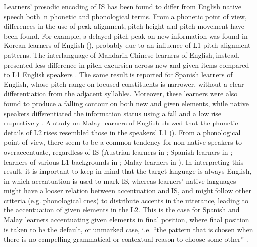 Learners’ prosodic encoding of IS has been found to differ from English native speech both in phonetic and phonological terms. From a phonetic point of view, differences in the use of peak alignment, pitch height and pitch movement have been found. For example, a delayed pitch peak on new information was found in Korean learners of English (\citealt{TrofimovichBaker2006}), probably due to an influence of L1 pitch alignment patterns. The interlanguage of Mandarin Chinese learners of English, instead, presented less difference in pitch excursion across new and given items compared to L1 English speakers \citep{Wennerstrom1998}. The same result is reported for Spanish learners of English, whose pitch range on focused constituents is narrower, without a clear differentiation from the adjacent syllables. Moreover, these learners were also found to produce a falling contour on both new and given elements, while native speakers differentiated the information status using a fall and a low rise respectively \citep{Verdugo2003}. A study on Malay learners of English showed that the phonetic details of L2 rises resembled those in the speakers’ L1 (\citealt{GutPillai2014}). From a phonological point of view, there seem to be a common tendency for non-native speakers to overaccentuate, regardless of IS (Austrian learners in \citealt{Grosser1997}; Spanish learners in \citealt{Verdugo2003}; learners of various L1 backgrounds in \citealt{Gut2009}; Malay learners in \citealt{GutPillai2014}). In interpreting this result, it is important to keep in mind that the target language is always English, in which accentuation is used to mark IS, whereas learners’ native languages might have a looser relation between accentuation and IS, and might follow other criteria (e.g. phonological ones) to distribute accents in the utterance, leading to the accentuation of given elements in the L2. This is the case for Spanish and Malay learners accentuating given elements in final position, where final position is taken to be the default, or unmarked case, i.e. “the pattern that is chosen when there is no compelling grammatical or contextual reason to choose some other” \citep[223]{Ladd2008}.

